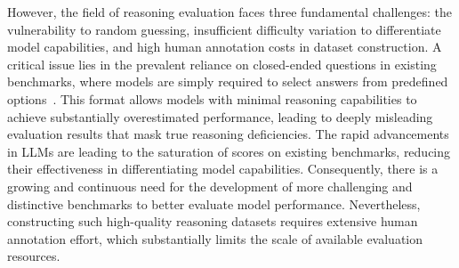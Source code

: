 However, the field of reasoning evaluation faces three fundamental challenges: the vulnerability to random guessing, insufficient difficulty variation to differentiate model capabilities, and high human annotation costs in dataset construction. A critical issue lies in the prevalent reliance on closed-ended questions in existing benchmarks, where models are simply required to select answers from predefined options~\cite{liu2020logiqachallengedatasetmachine,bansal2023fewshotunifiedquestionanswering,zhong2021ar,han2024folionaturallanguagereasoning,ismayilzada2023crowbenchmarkingcommonsensereasoning}. This format allows models with minimal reasoning capabilities to achieve substantially overestimated performance, leading to deeply misleading evaluation results that mask true reasoning deficiencies. The rapid advancements in LLMs are leading to the saturation of scores on existing benchmarks, reducing their effectiveness in differentiating model capabilities. Consequently, there is a growing and continuous need for the development of more challenging and distinctive benchmarks to better evaluate model performance. Nevertheless, constructing such high-quality reasoning datasets requires extensive human annotation effort, which substantially limits the scale of available evaluation resources.



